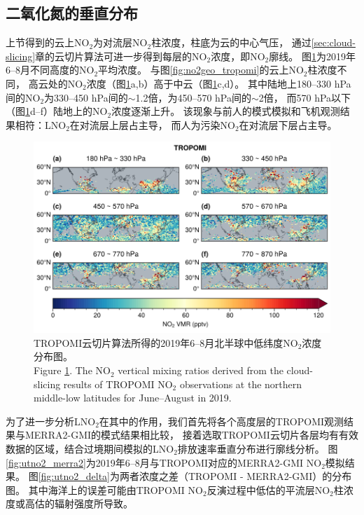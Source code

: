 \subsection{二氧化氮的垂直分布} \label{sec:no2_profile}


上节得到的云上NO$_2$为对流层NO$_2$柱浓度，柱底为云的中心气压，
通过\ref{sec:cloud-slicing}章的云切片算法可进一步得到每层的NO$_2$浓度，即NO$_2$廓线。
图\ref{fig:utno2_tropomi}为2019年6--8月不同高度的NO$_2$平均浓度。
与图\ref{fig:no2geo_tropomi}的云上NO$_2$柱浓度不同，
高云处的NO$_2$浓度（图\ref{fig:utno2_tropomi}a,b）高于中云（图\ref{fig:utno2_tropomi}c,d）。
其中陆地上180--330 hPa间的NO$_2$为330--450 hPa间的$\sim$1.2倍，为450--570 hPa间的$\sim$2倍，
而570 hPa以下（图\ref{fig:utno2_tropomi}d--f）陆地上的NO$_2$浓度逐渐上升。
该现象与前人的模式模拟和飞机观测结果相符：LNO$_2$在对流层上层占主导，
而人为污染NO$_2$在对流层下层占主导\citep{Pickering.1996,Ott.2010,Laughner.2017}。


\begin{figure}[H]
    \centering
    \includegraphics[width=13cm]{./figures/utno2_tropomi.png}
    \caption{
    TROPOMI云切片算法所得的2019年6--8月北半球中低纬度NO$_2$浓度分布图。 \\
    Figure \ref{fig:utno2_tropomi}. The NO$_2$ vertical mixing ratios derived from the cloud-slicing results of TROPOMI NO$_2$ observations at the northern middle-low latitudes for June--August in 2019.
    }
    \label{fig:utno2_tropomi}
\end{figure}

为了进一步分析LNO$_2$在其中的作用，我们首先将各个高度层的TROPOMI观测结果与MERRA2-GMI的模式结果相比较，
接着选取TROPOMI云切片各层均有有效数据的区域，结合过境期间模拟的LNO$_2$排放速率垂直分布进行廓线分析。
图\ref{fig:utno2_merra2}为2019年6--8月与TROPOMI对应的MERRA2-GMI NO$_2$模拟结果。
图\ref{fig:utno2_delta}为两者浓度之差（TROPOMI - MERRA2-GMI）的分布图。
其中海洋上的误差可能由TROPOMI NO$_2$反演过程中低估的平流层NO$_2$柱浓度或高估的辐射强度所导致\citep{VanGeffen.2020}。

